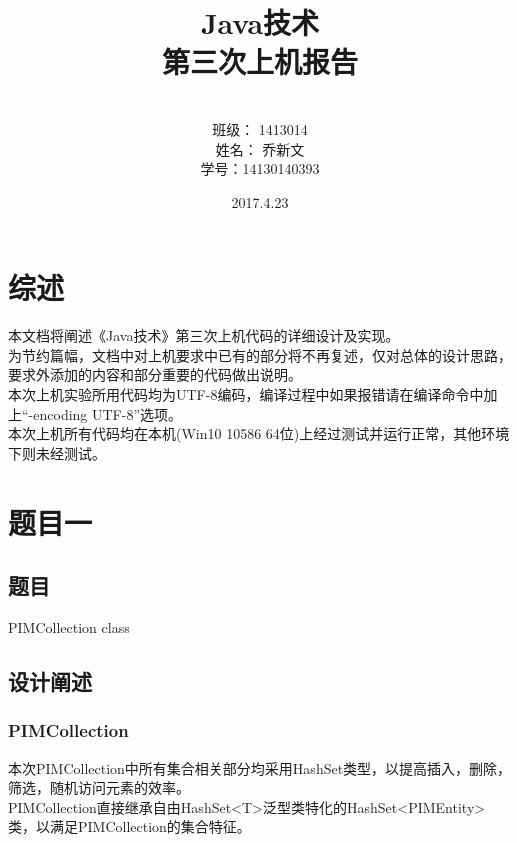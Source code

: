 \documentclass[a4paper]{article}
\begin{document}
\title{\Huge Java技术\\ 第三次上机报告}
\author { \vspace{12cm} \\ \LARGE 班级：  1413014  \\ \LARGE 姓名：  乔新文   \\ \LARGE 学号：14130140393} 
\date{ \vspace{4cm} 2017.4.23}

\maketitle
\clearpage

\tableofcontents

\clearpage

\section{综述}

本文档将阐述《Java技术》第三次上机代码的详细设计及实现。\\

为节约篇幅，文档中对上机要求中已有的部分将不再复述，仅对总体的设计思路，要求外添加的内容和部分重要的代码做出说明。\\

本次上机实验所用代码均为UTF-8编码，编译过程中如果报错请在编译命令中加上“-encoding UTF-8”选项。\\

本次上机所有代码均在本机(Win10 10586 64位)上经过测试并运行正常，其他环境下则未经测试。

\section{题目一}

\subsection{题目}

PIMCollection class

\subsection{设计阐述}
    \subsubsection{PIMCollection}
    本次PIMCollection中所有集合相关部分均采用HashSet类型，以提高插入，删除，筛选，随机访问元素的效率。\\
    PIMCollection直接继承自由HashSet<T>泛型类特化的HashSet<PIMEntity>类，以满足PIMCollection的集合特征。\\
        
\end{document}
